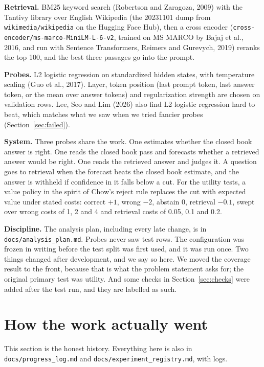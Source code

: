 \documentclass[11pt,a4paper]{article}
\begin{document}
\textbf{Retrieval.} BM25 keyword search (Robertson and Zaragoza, 2009) with the Tantivy library over English Wikipedia (the 20231101 dump from \nolinkurl{wikimedia/wikipedia} on the Hugging Face Hub), then a cross encoder (\nolinkurl{cross-encoder/ms-marco-MiniLM-L-6-v2}, trained on MS MARCO by Bajaj et al., 2016, and run with Sentence Transformers, Reimers and Gurevych, 2019) reranks the top 100, and the best three passages go into the prompt.

\textbf{Probes.} L2 logistic regression on standardized hidden states, with temperature scaling (Guo et al., 2017). Layer, token position (last prompt token, last answer token, or the mean over answer tokens) and regularization strength are chosen on validation rows. Lee, Seo and Lim (2026) also find L2 logistic regression hard to beat, which matches what we saw when we tried fancier probes (Section~\ref{sec:failed}).

\textbf{System.} Three probes share the work. One estimates whether the closed book answer is right. One reads the closed book pass and forecasts whether a retrieved answer would be right. One reads the retrieved answer and judges it. A question goes to retrieval when the forecast beats the closed book estimate, and the answer is withheld if confidence in it falls below a cut. For the utility tests, a value policy in the spirit of Chow's reject rule replaces the cut with expected value under stated costs: correct $+1$, wrong $-2$, abstain 0, retrieval $-0.1$, swept over wrong costs of 1, 2 and 4 and retrieval costs of 0.05, 0.1 and 0.2.

\textbf{Discipline.} The analysis plan, including every late change, is in \nolinkurl{docs/analysis_plan.md}. Probes never saw test rows. The configuration was frozen in writing before the test split was first used, and it was run once. Two things changed after development, and we say so here. We moved the coverage result to the front, because that is what the problem statement asks for; the original primary test was utility. And some checks in Section~\ref{sec:checks} were added after the test run, and they are labelled as such.

\section{How the work actually went}

This section is the honest history. Everything here is also in \nolinkurl{docs/progress_log.md} and \nolinkurl{docs/experiment_registry.md}, with logs.
\end{document}
